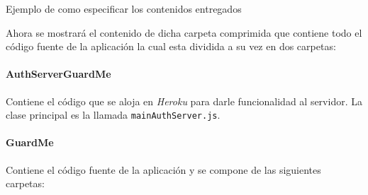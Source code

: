 \textcolor[rgb]{0.65,0.16,0}{Ejemplo de como especificar los contenidos entregados}

Ahora se mostrará el contenido de dicha carpeta comprimida que contiene todo el código fuente de la aplicación la cual esta dividida a su vez en dos carpetas:

\paragraph*{AuthServerGuardMe}
Contiene el código que se aloja en \textit{Heroku} para darle funcionalidad al servidor. La clase principal es la llamada \texttt{mainAuthServer.js}.

\paragraph*{GuardMe}
Contiene el código fuente de la aplicación y se compone de las siguientes carpetas:
